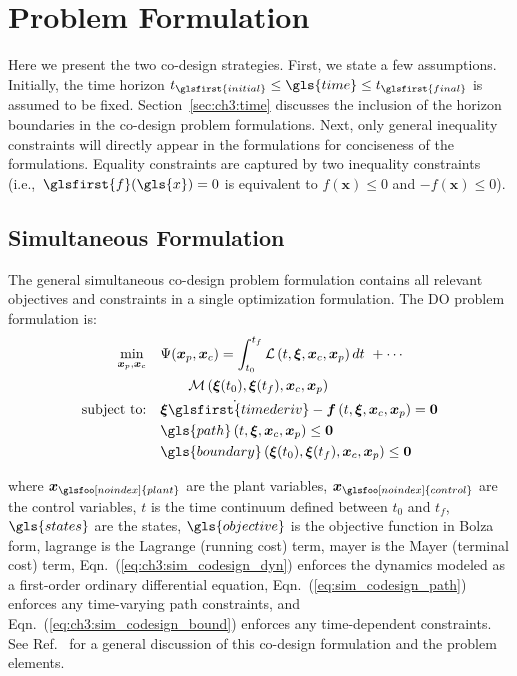 \section{Problem Formulation \label{sec:ch3:formulation}}

Here we  present the two co-design strategies. First, we state a few assumptions. Initially, the time horizon $t_{\glsfirst{initial}} \leq \gls{time} \leq t_{\glsfirst{final}}$ is assumed to be fixed. Section~\ref{sec:ch3:time} discusses the inclusion of the horizon boundaries in the co-design problem formulations.
Next, only general inequality constraints will directly appear in the formulations for conciseness of the formulations. Equality constraints are captured by two inequality constraints (i.e.,~$\glsfirst{f}(\gls{x}) = 0$ is equivalent to $f(\bm{x}) \leq 0$ and $-f(\bm{x}) \leq 0$). %

\subsection{Simultaneous Formulation}

The general simultaneous co-design problem formulation contains all relevant objectives and constraints in a single optimization formulation. %
The DO problem formulation is:
\begingroup
\allowdisplaybreaks
\begin{subequations}
\label{eq:simprob}
\begin{align}
\min_{\bxp, \bxc} \quad & \Psi(\bxp, \bxc) = \int_{t_0}^{t_f} \lagrange \left( t, \bxi, \bxc, \bxp \right) dt \ + \cdots \label{eq:ch3:sim_lagrange} \\
& \qquad \mayer \left( \bxi(t_0), \bxi(t_f), \bxc, \bxp \right) \label{eq:ch3:sim_mayer} \\
\text{subject to:} \quad & \dot{\bxi \glsfirst{timederiv}} - \bfd \left( t, \bxi, \bxc, \bxp \right) = \bzero \label{eq:ch3:sim_codesign_dyn} \\
& \gls{path} \left( t, \bxi, \bxc, \bxp \right) \leq \bzero \label{eq:sim_codesign_path} \\
& \gls{boundary} \left( \bxi(t_0), \bxi(t_f), \bxc, \bxp \right) \leq \bzero \label{eq:ch3:sim_codesign_bound}
\end{align}
\end{subequations}%
\endgroup

\noindent where $\bm{x}_{\glsfoo[noindex]{plant}}$ are the plant variables, $\bm{x}_{\glsfoo[noindex]{control}}$ are the control variables, $t$ is the time continuum defined between $t_0$ and $t_f$, $\gls{states}$ are the states, $\gls{objective}$ is the objective function in Bolza form, \gls{lagrange} is the Lagrange (running cost) term, \gls{mayer} is the Mayer (terminal cost) term, Eqn.~(\ref{eq:ch3:sim_codesign_dyn}) enforces the dynamics modeled as a first-order ordinary differential equation, Eqn.~(\ref{eq:sim_codesign_path}) enforces any time-varying path constraints, and Eqn.~(\ref{eq:ch3:sim_codesign_bound}) enforces any time-dependent constraints. See Ref.~\cite{Herber2014a} for a general discussion of this co-design formulation and the problem elements.

